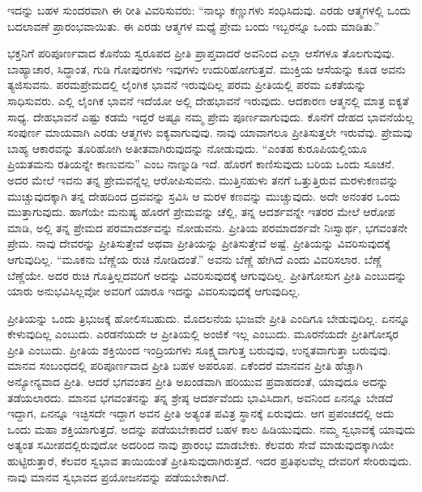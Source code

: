 ಇದನ್ನು ಬಹಳ ಸುಂದರವಾಗಿ ಈ ರೀತಿ ವಿವರಿಸುವರು: “ನಾಲ್ಕು ಕಣ್ಣುಗಳು ಸಂಧಿಸಿದುವು. ಎರಡು ಆತ್ಮಗಳಲ್ಲಿ ಒಂದು ಬದಲಾವಣೆ ಪ್ರಾರಂಭವಾಯಿತು. ಈ ಎರಡು ಆತ್ಮಗಳ ಮಧ್ಯೆ ಪ್ರೇಮ ಬಂದು ಇಬ್ಬರನ್ನೂ ಒಂದು ಮಾಡಿತು.”

ಭಕ್ತನಿಗೆ ಪರಿಪೂರ್ಣವಾದ ಕೊನೆಯ ಸ್ವರೂಪದ ಪ್ರೀತಿ ಪ್ರಾಪ್ತವಾದರೆ ಅವನಿಂದ ಎಲ್ಲಾ ಆಸೆಗಳೂ ತೊಲಗುವುವು. ಬಾಹ್ಯಾಚಾರ, ಸಿದ್ಧಾಂತ, ಗುಡಿ ಗೋಪುರಗಳು ಇವುಗಳು ಉದುರಿಹೋಗುತ್ತವೆ. ಮುಕ್ತಿಯ ಆಸೆಯನ್ನು ಕೂಡ ಅವನು ತ್ಯಜಿಸುವನು. ಪರಮಪ್ರೇಮದಲ್ಲಿ ಲೈಂಗಿಕ ಭಾವನೆ ಇರುವುದಿಲ್ಲ ಪರಮ ಪ್ರೀತಿಯಲ್ಲಿ ಪರಮ ಏಕತೆಯನ್ನು ಸಾಧಿಸುವರು. ಎಲ್ಲಿ ಲೈಂಗಿಕ ಭಾವನೆ ಇದೆಯೋ ಅಲ್ಲಿ ದೇಹಭಾವನೆ ಇರುವುದು. ಆದಕಾರಣ ಆತ್ಮನಲ್ಲಿ ಮಾತ್ರ ಐಕ್ಯತೆ ಸಾಧ್ಯ. ದೇಹಭಾವನೆ ಎಷ್ಟು ಕಡಮೆ ಇದ್ದರೆ ಅಷ್ಟೂ ನಮ್ಮ ಪ್ರೇಮ ಪೂರ್ಣವಾಗುವುದು. ಕೊನೆಗೆ ದೇಹದ ಭಾವನೆಯೆಲ್ಲ ಸಂಪುರ್ಣ ಮಾಯವಾಗಿ ಎರಡು ಆತ್ಮಗಳು ಐಕ್ಯವಾಗುವುವು. ನಾವು ಯಾವಾಗಲೂ ಪ್ರೀತಿಸುತ್ತಲೇ ಇರುವೆವು. ಪ್ರೇಮವು ಬಾಹ್ಯ ಆಕಾರವನ್ನು ತೂರಿಹೋಗಿ ಅತೀತವಾಗಿರುವುದನ್ನು ನೋಡುವುದು. “ಎಂತಹ ಕುರೂಪಿಯಲ್ಲಿಯೂ ಪ್ರಿಯತಮನು ರತಿಯನ್ನೇ ಕಾಣುವನು” ಎಂಬ ನಾಣ್ನುಡಿ ಇದೆ. ಹೊರಗೆ ಕಾಣಿಸುವುದು ಬರಿಯ ಒಂದು ಸೂಚನೆ. ಅದರ ಮೇಲೆ ಇವನು ತನ್ನ ಪ್ರೇಮವನ್ನೆಲ್ಲ ಆರೋಪಿಸುವನು. ಮುತ್ತಿನಹುಳು ತನಗೆ ಒತ್ತುತ್ತಿರುವ ಮರಳು\break ಕಣವನ್ನು ಮುಚ್ಚುವುದಕ್ಕಾಗಿ ತನ್ನ ದೇಹದಿಂದ ದ್ರವವನ್ನು ಸ್ರವಿಸಿ ಆ ಮರಳ ಕಣವನ್ನು ಮುಚ್ಚುವುದು. ಅದೇ ಅನಂತರ ಒಂದು ಮುತ್ತಾಗುವುದು. ಹಾಗೆಯೇ ಮನುಷ್ಯ ಹೊರಗೆ ಪ್ರೇಮವನ್ನು ಚೆಲ್ಲಿ, ತನ್ನ ಆದರ್ಶವನ್ನೇ ಇತರರ ಮೇಲೆ ಆರೋಪ ಮಾಡಿ, ಅಲ್ಲಿ ತನ್ನ ಪ್ರೇಮದ ಪರಮಾದರ್ಶವನ್ನು ನೋಡುವನು. ಪ್ರೀತಿಯ ಪರಮಾದರ್ಶವೇ ನಿಃಸ್ವಾರ್ಥ, ಭಗವಂತನೇ ಪ್ರೇಮ. ನಾವು ದೇವರನ್ನು ಪ್ರೀತಿಸುತ್ತೇವೆ ಅಥವಾ ಪ್ರೀತಿಯನ್ನು ಪ್ರೀತಿಸುತ್ತೇವೆ ಅಷ್ಟೆ. ಪ್ರೀತಿಯನ್ನು ವಿವರಿಸುವುದಕ್ಕೆ ಆಗುವುದಿಲ್ಲ. “ಮೂಕನು ಬೆಣ್ಣೆಯ ರುಚಿ ನೋಡಿದಂತೆ.” ಅವನು ಬೆಣ್ಣೆ ಹೇಗಿದೆ ಎಂದು ವಿವರಿಸಲಾರ. ಬೆಣ್ಣೆ ಬೆಣ್ಣೆಯೇ. ಅದರ ರುಚಿ ಗೊತ್ತಿಲ್ಲದವರಿಗೆ ಅದನ್ನು ವಿವರಿಸುವುದಕ್ಕೆ ಆಗುವುದಿಲ್ಲ. ಪ್ರೀತಿಗೋಸುಗ ಪ್ರೀತಿ ಎಂಬುದನ್ನು ಯಾರು ಅನುಭವಿಸಿಲ್ಲವೋ ಅವರಿಗೆ ಯಾರೂ ಇದನ್ನು ವಿವರಿಸುವುದಕ್ಕೆ ಆಗುವುದಿಲ್ಲ.

\vskip 0.2cm

ಪ್ರೀತಿಯನ್ನು ಒಂದು ತ್ರಿಭುಜಕ್ಕೆ ಹೋಲಿಸಬಹುದು. ಮೊದಲನೆಯ ಭುಜವೇ ಪ್ರೀತಿ ಎಂದಿಗೂ ಬೇಡುವುದಿಲ್ಲ. ಏನನ್ನೂ ಕೇಳುವುದಿಲ್ಲ ಎಂಬುದು. ಎರಡನೆಯದೇ ಆ ಪ್ರೀತಿಯಲ್ಲಿ ಅಂಜಿಕೆ ಇಲ್ಲ ಎಂಬುದು. ಮೂರನೆಯದೇ ಪ್ರೀತಿಗೋಸ್ಕರ ಪ್ರೀತಿ ಎಂಬುದು. ಪ್ರೀತಿಯ ಶಕ್ತಿಯಿಂದ ಇಂದ್ರಿಯಗಳು ಸೂಕ್ಷ್ಮವಾಗುತ್ತ ಬರುವುವು, ಉನ್ನತವಾಗುತ್ತಾ ಬರುವುವು. ಮಾನವ ಸಂಬಂಧದಲ್ಲಿ ಪರಿಪೂರ್ಣವಾದ ಪ್ರೀತಿ ಬಹಳ ಅಪರೂಪ. ಏಕೆಂದರೆ ಮಾನವನ ಪ್ರೀತಿ ಹೆಚ್ಚಾಗಿ ಅನ್ಯೋನ್ಯವಾದ ಪ್ರೀತಿ. ಆದರೆ ಭಗವಂತನ ಪ್ರೀತಿ ಅಖಂಡವಾಗಿ ಹರಿಯುವ ಪ್ರವಾಹದಂತೆ, ಯಾವುದೂ ಅದನ್ನು ತಡೆಯಲಾರದು. ಮಾನವ ಭಗವಂತನನ್ನು ತನ್ನ ಶ್ರೇಷ್ಠ ಆದರ್ಶವೆಂದು ಭಾವಿಸಿದಾಗ, ಅವನಿಂದ ಏನನ್ನೂ ಬೇಡದೆ ಇದ್ದಾಗ, ಏನನ್ನೂ ಇಚ್ಛಿಸದೇ ಇದ್ದಾಗ ಅವನ ಪ್ರೀತಿ ಅತ್ಯಂತ ಪವಿತ್ರ ಸ್ಥಾನಕ್ಕೆ ಏರುವುದು. ಆಗ ಪ್ರಪಂಚದಲ್ಲಿ ಅದು ಒಂದು ಮಹಾ ಶಕ್ತಿಯಾಗುತ್ತದೆ. ಅದನ್ನು ಪಡೆಯಬೇಕಾದರೆ ಬಹಳ ಕಾಲ ಹಿಡಿಯುವುದು. ನಮ್ಮ ಸ್ವಭಾವಕ್ಕೆ ಯಾವುದು ಅತ್ಯಂತ ಸಮೀಪದಲ್ಲಿರುವುದೋ ಅದರಿಂದ ನಾವು ಪ್ರಾರಂಭ ಮಾಡಬೇಕು. ಕೆಲವರು ಸೇವೆ ಮಾಡುವುದಕ್ಕಾಗಿಯೇ ಹುಟ್ಟಿರುತ್ತಾರೆ, ಕೆಲವರ ಸ್ವಭಾವ ತಾಯಿಯಂತೆ ಪ್ರೀತಿಸುವುದಾಗಿರುತ್ತದೆ. ಇದರ ಪ್ರತಿಫಲವೆಲ್ಲ ದೇವರಿಗೆ ಸೇರಿರುವುದು. ನಾವು ಮಾನವ ಸ್ವಭಾವದ ಪ್ರಯೋಜನವನ್ನು ಪಡೆಯಬೇಕಾಗಿದೆ.

